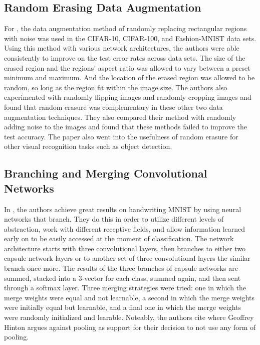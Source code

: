 \documentclass{IEEEtran}
\begin{document}
\subsection{Random Erasing Data Augmentation}
For \cite{zhong2017random}, the data augmentation method of randomly replacing
rectangular regions with noise was used in the CIFAR-10, CIFAR-100, and
Fashion-MNIST data sets. Using this method with various network architectures,
the authors were able consistently to improve on the test error rates across
data sets. The size of the erased region and the regions' aspect ratio was
allowed to vary between a preset minimum and maximum. And the location of the
erased region was allowed to be random, so long as the region fit within the
image size. The authors also experimented with randomly flipping images and
randomly cropping images and found that random erasure was complementary in
these other two data augmentation techniques. They also compared their method
with randomly adding noise to the images and found that these methods failed to
improve the test accuracy. The paper also went into the usefulness of random 
erasure for other visual recognition tasks such as object detection.

\subsection{Branching and Merging Convolutional Networks}
In \cite{byerly2020branching}, the authors achieve great results on
handwriting MNIST by using neural networks that branch. They do this in order to
utilize different levels of abstraction, work with different receptive fields,
and allow information learned early on to be easily accessed at the moment of
classification. The network architecture starts with three convolutional layers,
then branches to either two capsule network layers or to another set of three
convolutional layers the similar branch once more. The results of the three
branches of capsule networks are summed, stacked into a 3-vector for each class,
summed again, and then sent through a softmax layer. Three merging strategies
were tried: one in which the merge weights were equal and not learnable,
a second in which the merge weights were initially equal but learnable, and a
final one in which the merge weights were randomly initialized and learable.
Noteably, the authors cite \cite{hinton2014CNNs} where Geoffrey Hinton argues
against pooling as support for their decision to not use any form of pooling.
\end{document}
